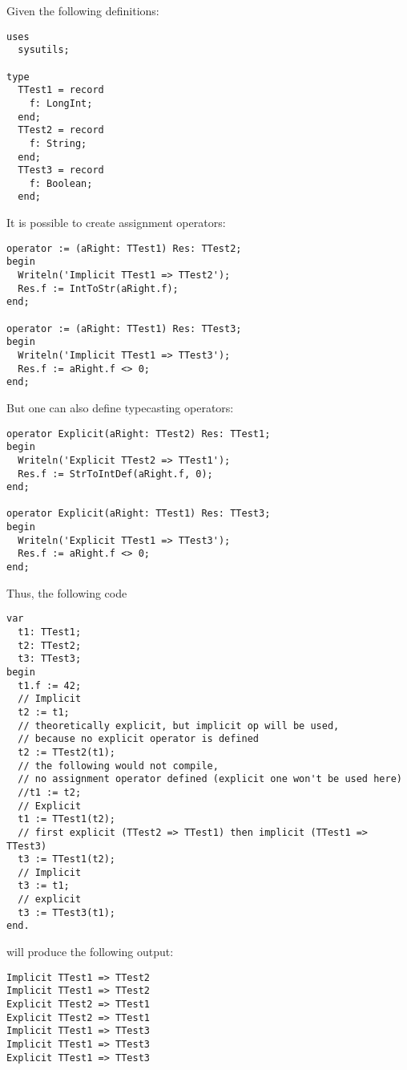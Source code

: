 Given the following definitions:
\begin{verbatim}
uses
  sysutils;

type
  TTest1 = record
    f: LongInt;
  end;
  TTest2 = record
    f: String;
  end;
  TTest3 = record
    f: Boolean;
  end;
\end{verbatim}
It is possible to create assignment operators:
\begin{verbatim}
operator := (aRight: TTest1) Res: TTest2;
begin
  Writeln('Implicit TTest1 => TTest2');
  Res.f := IntToStr(aRight.f);
end;

operator := (aRight: TTest1) Res: TTest3;
begin
  Writeln('Implicit TTest1 => TTest3');
  Res.f := aRight.f <> 0;
end;
\end{verbatim}
But one can also define typecasting operators:
\begin{verbatim}
operator Explicit(aRight: TTest2) Res: TTest1;
begin
  Writeln('Explicit TTest2 => TTest1');
  Res.f := StrToIntDef(aRight.f, 0);
end;

operator Explicit(aRight: TTest1) Res: TTest3;
begin
  Writeln('Explicit TTest1 => TTest3');
  Res.f := aRight.f <> 0;
end;
\end{verbatim}
Thus, the following code
\begin{verbatim}
var
  t1: TTest1;
  t2: TTest2;
  t3: TTest3;
begin
  t1.f := 42;
  // Implicit
  t2 := t1;
  // theoretically explicit, but implicit op will be used,
  // because no explicit operator is defined
  t2 := TTest2(t1);
  // the following would not compile,
  // no assignment operator defined (explicit one won't be used here)
  //t1 := t2;
  // Explicit
  t1 := TTest1(t2);
  // first explicit (TTest2 => TTest1) then implicit (TTest1 => TTest3)
  t3 := TTest1(t2);
  // Implicit
  t3 := t1;
  // explicit
  t3 := TTest3(t1);
end.
\end{verbatim}
will produce the following output:
\begin{verbatim}
Implicit TTest1 => TTest2
Implicit TTest1 => TTest2
Explicit TTest2 => TTest1
Explicit TTest2 => TTest1
Implicit TTest1 => TTest3
Implicit TTest1 => TTest3
Explicit TTest1 => TTest3
\end{verbatim}

